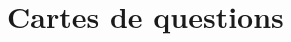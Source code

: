 \documentclass[a4paper]{article}
\begin{document}


\section{Cartes de questions}
\thispagestyle{empty}



\restoregeometry
\end{document}
